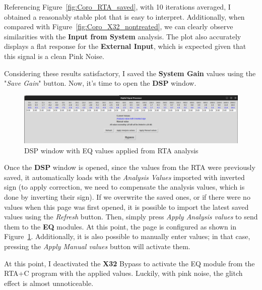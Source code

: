 Referencing Figure~\ref{fig:Coro_RTA_saved}, with 10 iterations averaged, I obtained a reasonably stable plot that is easy to interpret. Additionally, when compared with Figure~\ref{fig:Coro_X32_nontreated}, we can clearly observe similarities with the \textbf{Input from System} analysis. The plot also accurately displays a flat response for the \textbf{External Input}, which is expected given that this signal is a clean Pink Noise.

Considering these results satisfactory, I saved the \textbf{System Gain} values using the "\textit{Save Gain}" button. Now, it's time to open the \textbf{DSP} window.

\begin{figure}[H]
	\centering
	\includegraphics[width=1
	\linewidth]{Figures/Coro_EQ_from_RTA.png}
	\caption{DSP window with EQ values applied from RTA analysis}
	\label{fig:Coro_EQ_RTA+C}
\end{figure}

Once the \textbf{DSP} window is opened, since the values from the RTA were previously saved, it automatically loads with the \textit{Analysis Values} imported with inverted sign (to apply correction, we need to compensate the analysis values, which is done by inverting their sign). If we overwrite the saved ones, or if there were no values when this page was first opened, it is possible to import the latest saved values using the \textit{Refresh} button. Then, simply press \textit{Apply Analysis values} to send them to the \textbf{EQ} modules. At this point, the page is configured as shown in Figure~\ref{fig:Coro_EQ_RTA+C}. Additionally, it is also possible to manually enter values; in that case, pressing the \textit{Apply Manual values} button will activate them.

At this point, I deactivated the \textbf{X32} Bypass to activate the EQ module from the RTA+C program with the applied values. Luckily, with pink noise, the glitch effect is almost unnoticeable.

